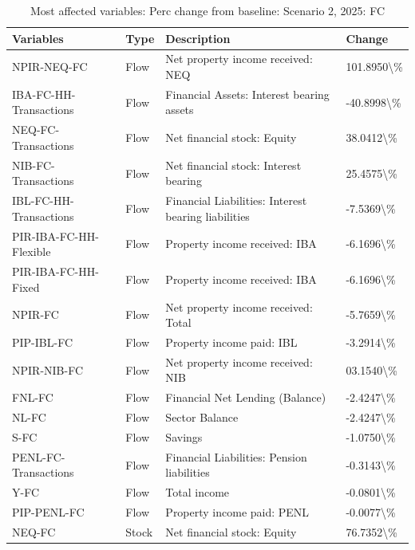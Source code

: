 \documentclass[
]{book}
\begin{document}
\begin{table}

\caption{\label{tab:most-affected-scenario-2-perc-2025-FC}Most affected variables: Perc change from baseline: Scenario 2, 2025: FC}
\centering
\fontsize{10}{12}\selectfont
\begin{tabular}[t]{l|l|l|l}
\hline
Variables & Type & Description & Change\\
\hline
NPIR-NEQ-FC & Flow & Net property income received: NEQ & 101.8950\textbackslash{}\%\\
\hline
IBA-FC-HH-Transactions & Flow & Financial Assets: Interest bearing assets & -40.8998\textbackslash{}\%\\
\hline
NEQ-FC-Transactions & Flow & Net financial stock: Equity & 38.0412\textbackslash{}\%\\
\hline
NIB-FC-Transactions & Flow & Net financial stock: Interest bearing & 25.4575\textbackslash{}\%\\
\hline
IBL-FC-HH-Transactions & Flow & Financial Liabilities: Interest bearing liabilities & -7.5369\textbackslash{}\%\\
\hline
PIR-IBA-FC-HH-Flexible & Flow & Property income received: IBA & -6.1696\textbackslash{}\%\\
\hline
PIR-IBA-FC-HH-Fixed & Flow & Property income received: IBA & -6.1696\textbackslash{}\%\\
\hline
NPIR-FC & Flow & Net property income received: Total & -5.7659\textbackslash{}\%\\
\hline
PIP-IBL-FC & Flow & Property income paid: IBL & -3.2914\textbackslash{}\%\\
\hline
NPIR-NIB-FC & Flow & Net property income received: NIB & 03.1540\textbackslash{}\%\\
\hline
FNL-FC & Flow & Financial Net Lending (Balance) & -2.4247\textbackslash{}\%\\
\hline
NL-FC & Flow & Sector Balance & -2.4247\textbackslash{}\%\\
\hline
S-FC & Flow & Savings & -1.0750\textbackslash{}\%\\
\hline
PENL-FC-Transactions & Flow & Financial Liabilities: Pension liabilities & -0.3143\textbackslash{}\%\\
\hline
Y-FC & Flow & Total income & -0.0801\textbackslash{}\%\\
\hline
PIP-PENL-FC & Flow & Property income paid: PENL & -0.0077\textbackslash{}\%\\
\hline
NEQ-FC & Stock & Net financial stock: Equity & 76.7352\textbackslash{}\%\\

\end{tabular}
\end{table}
\end{document}
